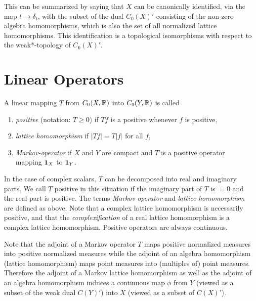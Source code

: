 This can be summarized by saying that $X$ can be canonically identified, via the map $t \to \delta_{t}$, with the subset of the dual $C_{0}(X)'$ consisting of the non-zero algebra homomorphisms, which is also the set of all normalized lattice homomorphisms.
This identification is a topological isomorphisms with respect to the weak*-topology of\/ $ C_{0}(X)' $.
\section{Linear Operators}\label{sec:b1-3}%
A linear mapping $T$ from $C_{0}(X,\mathbb{R})$ into $C_{0}(Y,\mathbb{R})$ is called
\begin{enumerate}[\upshape (i), labelindent=.25em]

\item
\emph{positive} (notation: $T \geq 0$)  if\/ $Tf$  is a positive whenever $ f $ is positive, 

\item
\emph{lattice homomorphism}  if\/ $|Tf| = T|f|$  for all $ f $,

\item
\emph{Markov-operator}  if  $ X $ and $ Y $ are compact and $ T $ is a positive operator mapping $\mathbf{1}_{X}$ to $\mathbf{1}_{Y}$.

\end{enumerate}
In the case of complex scalars, $T$ can be decomposed into real and imaginary parts.
We call $T$ positive in this situation if the imaginary part of\/ $T$ is $= 0$ and the real part is positive.
The terms \emph{Markov operator} and \emph{lattice homomorphism} are defined as above.
Note that a complex lattice homomorphism is necessarily positive, and that the \emph{complexification} of a real lattice homomorphism is a complex lattice homomorphism.
Positive operators are always continuous.

Note that the adjoint of a Markov operator $T$ maps positive normalized measures into positive normalized measures while the adjoint of an algebra homomorphism (lattice homomorphism) maps point measures into (multiples of) point measures.
Therefore the adjoint of a Markov lattice homomorphism as well as the adjoint of an algebra homomorphism induces a continuous map $\phi$ from $Y$ (viewed as a subset of the weak dual $C(Y)'$) into $X$ (viewed as a subset of\/ $C(X)'$).

